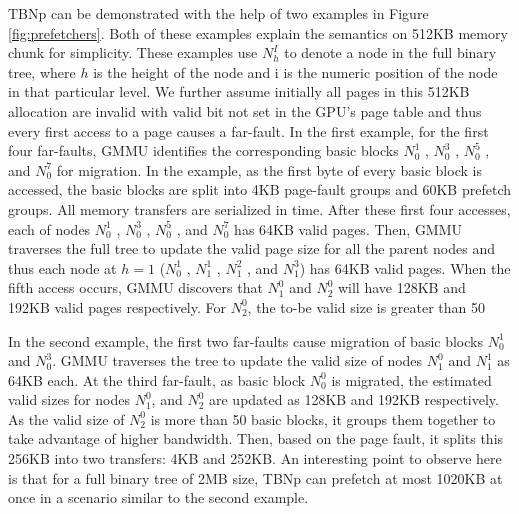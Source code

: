 TBNp can be demonstrated with the help of two examples in Figure \ref{fig:prefetchers}. Both of these examples explain the semantics on 512KB memory chunk for simplicity. These examples use $N_h^I$ to denote a node in the full binary tree, where $h$ is the height of the node and i is the numeric position of the node in that particular level. We further assume initially all pages in this 512KB allocation are invalid with valid bit not set in the GPU’s page table and thus every first access to a page causes a far-fault. In the first example, for the first four far-faults, GMMU identifies the corresponding basic blocks $N^1_0$ , $N^3_0$ , $N^5_0$ , and $N^7_0$ for migration. In the example, as the first byte of every basic block is accessed, the basic blocks are split into 4KB page-fault groups and 60KB prefetch groups. All memory transfers are serialized in time. After these first four accesses, each of nodes $N^1_0$ , $N^3_0$ , $N^5_0$ , and $N^7_0$ has 64KB valid pages. Then, GMMU traverses the full tree to update the valid page size for all the parent nodes and thus each node at $h = 1$ ($N^1_0$ , $N^1_1$ , $N^2_1$ , and $N^3_1$) has 64KB valid pages. When the fifth access occurs, GMMU discovers that $N^0_1$ and $N^0_2$ will have 128KB and 192KB valid pages respectively. For $N^0_2$, the to-be valid size is greater than 50%

In the second example, the first two far-faults cause migration of basic blocks $N^1_0$ and $N^3_0$. GMMU traverses the tree to update the
valid size of nodes $N^0_1$ and $N^1_1$ as 64KB each. At the third far-fault, as basic block $N^0_0$ is migrated, the estimated valid sizes for nodes $N^0_1$, and $N^0_2$ are updated as 128KB and 192KB respectively. As the valid size of $N^0_2$ is more than 50%
basic blocks, it groups them together to take advantage of higher bandwidth. Then, based on the page fault, it splits this 256KB into two transfers: 4KB and 252KB. An interesting point to observe here is that for a full binary tree of 2MB size, TBNp can prefetch at most 1020KB at once in a scenario similar to the second example.